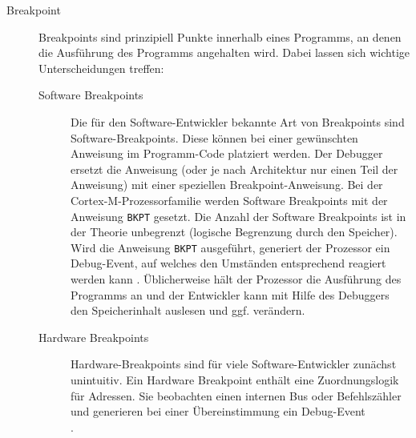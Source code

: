     \begin{description}
        \item[Breakpoint] Breakpoints sind prinzipiell Punkte innerhalb eines Programms, an denen die Ausführung
        des Programms angehalten wird. Dabei lassen sich wichtige Unterscheidungen treffen:
        \begin{description}
            \item[Software Breakpoints] Die für den Software\hyp{}Entwickler bekannte Art von Breakpoints sind
            Software\hyp{}Breakpoints. Diese können bei einer gewünschten Anweisung im Programm\hyp{}Code platziert werden.
            Der Debugger ersetzt die Anweisung (oder je nach Architektur nur einen Teil der Anweisung) mit einer
            speziellen Breakpoint-Anweisung. Bei der Cortex-M-Prozessorfamilie werden Software Breakpoints mit der
            Anweisung \texttt{BKPT} gesetzt. Die Anzahl der Software Breakpoints ist in der Theorie unbegrenzt (logische
            Begrenzung durch den Speicher). Wird die Anweisung \texttt{BKPT} ausgeführt, generiert der Prozessor
            ein Debug-Event, auf welches den Umständen entsprechend reagiert werden kann
            \citep[vgl. Kap. 14.5]{Yiu2013}.
            Üblicherweise hält der Prozessor die Ausführung des Programms an und der Entwickler kann mit Hilfe des
            Debuggers den Speicherinhalt auslesen und ggf. verändern.
            \item[Hardware Breakpoints] Hardware\hyp{}Breakpoints sind für viele Software\hyp{}Entwickler zunächst unintuitiv.
            Ein Hardware Breakpoint enthält eine Zuordnungslogik für Adressen. Sie beobachten einen internen
            Bus oder Befehlszähler und generieren bei einer Übereinstimmung ein Debug-Event\\\citep[]{Styger}.


\end{description}
\end{description}
